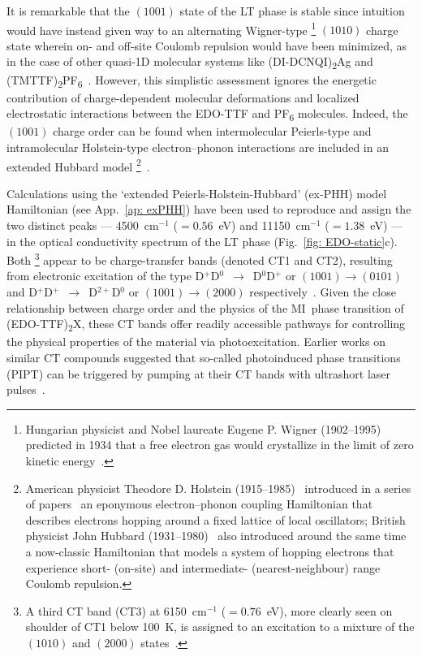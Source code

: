 It is remarkable that the $(1001)$ state of the LT phase is stable
since intuition would have instead given way to an alternating Wigner-type%
\footnote{Hungarian physicist and Nobel laureate Eugene P. Wigner (1902--1995) predicted in 1934
that a free electron gas would crystallize in the limit of zero kinetic energy~\cite{Nobel1963, Wigner1934}.}
$(1010)$ charge state wherein on- and off-site Coulomb repulsion would have been minimized,
as in the case of other quasi-1D molecular systems like
(DI-DCNQI)\textsubscript{2}Ag and (TMTTF)\textsubscript{2}PF\textsubscript{6}~\cite{Seo1997, Hiraki1998, Chow2000}.
%
However, this simplistic assessment ignores the energetic contribution of charge-dependent molecular deformations
and localized electrostatic interactions between the EDO-TTF and PF\textsubscript{6} molecules.
%
Indeed, the $(1001)$ charge order can be found when intermolecular Peierls-type and
intramolecular Holstein-type electron--phonon interactions are included in an extended Hubbard model%
\footnote{American physicist Theodore D. Holstein (1915--1985)~\cite{Emin1986}
introduced in a series of papers~\cite{Holstein1959} an eponymous electron--phonon coupling Hamiltonian
that describes electrons hopping around a fixed lattice of local oscillators;
British physicist John Hubbard (1931--1980)~\cite{Rice1981} also introduced
around the same time~\cite{Hubbard1963} a now-classic Hamiltonian that models
a system of hopping electrons that experience short- (on-site) and
intermediate- (nearest-neighbour) range Coulomb repulsion.}~\cite{Ung1994, Clay2003, Yonemitsu2007}.

Calculations using the `extended Peierls-Holstein-Hubbard' (ex-PHH) model Hamiltonian
(see App.~\ref{ap: exPHH})
have been used to reproduce and assign the two distinct peaks
--- 4500~cm$^{-1}$ ($= 0.56$~eV) and 11150~cm$^{-1}$ ($= 1.38$~eV) ---
in the optical conductivity spectrum of the LT phase (Fig.~\ref{fig: EDO-static}c).
%
Both%
\footnote{A third CT band (CT3) at 6150~cm$^{-1}$ ($= 0.76$~eV),
more clearly seen on shoulder of CT1 below 100~K, is assigned to an excitation
to a mixture of the $(1010)$ and $(2000)$ states~\cite{Drozdova2004}.}
appear to be charge-transfer bands (denoted CT1 and CT2),
resulting from electronic excitation of the type D$^+$D$^0$~$\rightarrow$~D$^0$D$^+$ or $(1001) \rightarrow (0101)$
and D$^+$D$^+$~$\rightarrow$~D$^{2+}$D$^0$ or $(1001) \rightarrow (2000)$
respectively~\cite{Drozdova2003, Drozdova2004, Yonemitsu2007}.
%
Given the close relationship between charge order and
the physics of the MI~phase transition of (EDO-TTF)\textsubscript{2}X,
these CT bands offer readily accessible pathways for controlling the physical properties of the material
via photoexcitation.
%
Earlier works on similar CT compounds suggested that so-called photoinduced phase transitions (PIPT)
can be triggered by pumping at their CT bands with ultrashort laser pulses~\cite{Koshihara1990, Karutz1998, Koshihara1998, Nasu2004}.


